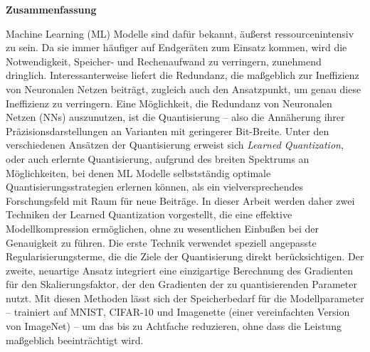 \thispagestyle{empty}
\vspace*{0.2cm}

\begin{center}
    \textbf{Zusammenfassung} \label{zusammenfassung}
\end{center}

\vspace*{0.2cm}

\noindent 
Machine Learning (ML) Modelle sind dafür bekannt,
äußerst ressourcenintensiv zu sein.
Da sie immer häufiger auf Endgeräten zum Einsatz kommen,
wird die Notwendigkeit, Speicher- und Rechenaufwand zu verringern, zunehmend dringlich.
Interessanterweise liefert die Redundanz,
die maßgeblich zur Ineffizienz von Neuronalen Netzen beiträgt,
zugleich auch den Ansatzpunkt, um genau diese Ineffizienz zu verringern.
Eine Möglichkeit, die Redundanz von Neuronalen Netzen (NNs) auszunutzen,
ist die Quantisierung –
also die Annäherung ihrer Präzisionsdarstellungen an Varianten mit geringerer Bit-Breite. 
Unter den verschiedenen Ansätzen der Quantisierung erweist sich
\textit{Learned Quantization}, oder auch erlernte Quantisierung, 
aufgrund des breiten Spektrums an Möglichkeiten,
bei denen ML Modelle selbstständig optimale Quantisierungsstrategien erlernen können,
als ein vielversprechendes Forschungsfeld mit Raum für neue Beiträge.
In dieser Arbeit werden daher zwei Techniken der Learned Quantization vorgestellt,
die eine effektive Modellkompression ermöglichen,
ohne zu wesentlichen Einbußen bei der Genauigkeit zu führen. 
Die erste Technik verwendet speziell angepasste Regularisierungsterme, 
die die Ziele der Quantisierung direkt berücksichtigen. 
Der zweite, neuartige Ansatz integriert eine einzigartige Berechnung des 
Gradienten für den Skalierungsfaktor, 
der den Gradienten der zu quantisierenden Parameter nutzt.
Mit diesen Methoden lässt sich der Speicherbedarf für die Modellparameter
– trainiert auf MNIST, CIFAR-10 und Imagenette
(einer vereinfachten Version von ImageNet)
– um das bis zu Achtfache reduzieren,
ohne dass die Leistung maßgeblich beeinträchtigt wird.